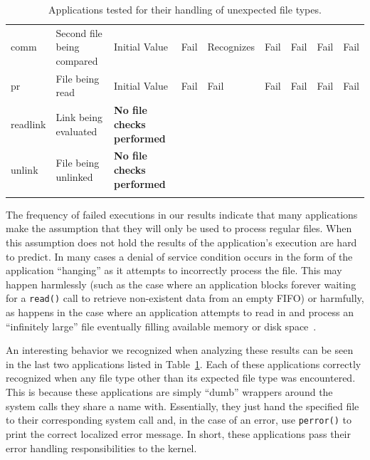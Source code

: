 \begin{table}[t]
\begin{tabular}{l  l  |  l  l  l  l  l  l  l}
        comm        & Second file being compared & Initial Value  & Fail           & Recognizes  & Fail       & Fail        & Fail       & Fail\\
        pr          & File being read            & Initial Value  & Fail           & Fail        & Fail       & Fail        & Fail       & Fail\\
\hline
        readlink    & Link being evaluated       & \textbf{No file checks performed} & & & & & & \\
        unlink      & File being unlinked        & \textbf{No file checks performed} & & & & & & \\
    \bottomrule{}
    \end{tabular}
    \caption{Applications tested for their handling of unexpected file types.}
    \label{table:unexpectedtypes}
\end{table}

The frequency of failed executions in our results indicate that many
applications make the assumption that they will only be used to process
regular files.  When this assumption does not hold the results of the
application's execution are hard to predict.  In many cases a denial of
service condition occurs in the form of the application ``hanging'' as it
attempts to incorrectly process the file.  This may happen harmlessly (such
as the case where an application blocks forever waiting for a {\tt read()}
call to retrieve non-existent data from an empty FIFO) or harmfully, as
happens in the case where an application attempts to read in and process an
``infinitely large'' file eventually filling available memory or disk
space~\cite{Cappos_CCS_08}. %


An interesting behavior we recognized when analyzing these results can be seen
in the last two applications listed in Table~\ref{table:unexpectedtypes}.  Each of these
applications correctly recognized when any file type other than its expected
file type was encountered.  This is because these applications are simply ``dumb'' wrappers
around the system calls they share a name with.  Essentially, they just hand
the specified file to their corresponding system call and, in the case of an
error, use {\tt perror()} to print the correct localized error message.  In
short, these applications pass their error handling responsibilities to the
kernel.

